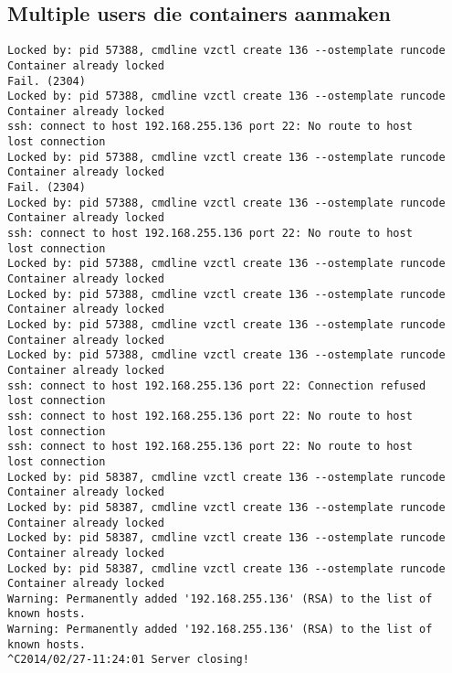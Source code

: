 \subsection{Multiple users die containers aanmaken}
\begin{lstlisting}
Locked by: pid 57388, cmdline vzctl create 136 --ostemplate runcode
Container already locked
Fail. (2304)
Locked by: pid 57388, cmdline vzctl create 136 --ostemplate runcode
Container already locked
ssh: connect to host 192.168.255.136 port 22: No route to host
lost connection
Locked by: pid 57388, cmdline vzctl create 136 --ostemplate runcode
Container already locked
Fail. (2304)
Locked by: pid 57388, cmdline vzctl create 136 --ostemplate runcode
Container already locked
ssh: connect to host 192.168.255.136 port 22: No route to host
lost connection
Locked by: pid 57388, cmdline vzctl create 136 --ostemplate runcode
Container already locked
Locked by: pid 57388, cmdline vzctl create 136 --ostemplate runcode
Container already locked
Locked by: pid 57388, cmdline vzctl create 136 --ostemplate runcode
Container already locked
Locked by: pid 57388, cmdline vzctl create 136 --ostemplate runcode
Container already locked
ssh: connect to host 192.168.255.136 port 22: Connection refused
lost connection
ssh: connect to host 192.168.255.136 port 22: No route to host
lost connection
ssh: connect to host 192.168.255.136 port 22: No route to host
lost connection
Locked by: pid 58387, cmdline vzctl create 136 --ostemplate runcode
Container already locked
Locked by: pid 58387, cmdline vzctl create 136 --ostemplate runcode
Container already locked
Locked by: pid 58387, cmdline vzctl create 136 --ostemplate runcode
Container already locked
Locked by: pid 58387, cmdline vzctl create 136 --ostemplate runcode
Container already locked
Warning: Permanently added '192.168.255.136' (RSA) to the list of known hosts.
Warning: Permanently added '192.168.255.136' (RSA) to the list of known hosts.
^C2014/02/27-11:24:01 Server closing!
\end{lstlisting}
    
